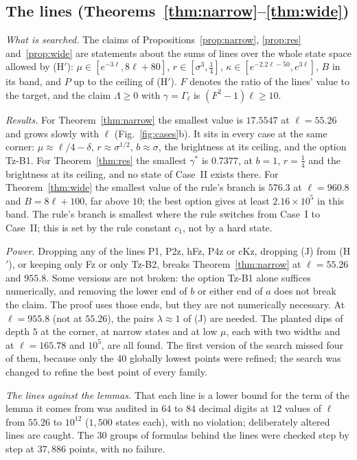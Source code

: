 \subsection{The lines (Theorems~\ref{thm:narrow}--\ref{thm:wide})}

\emph{What is searched.}
The claims of Propositions~\ref{prop:narrow}, \ref{prop:res} and~\ref{prop:wide} are statements about the sums of lines over the whole state space allowed by (H$'$): $\mu\in[e^{-3\ell},8\ell+80]$, $r\in[\sigma^3,\tfrac14]$, $\kappa\in[e^{-2.2\ell-50},e^{3\ell}]$, $B$ in its band, and $P$ up to the ceiling of (H$'$).
$F$ denotes the ratio of the lines' value to the target, and the claim $\Lambda\ge0$ with $\gamma=\Gamma_\ell$ is $(F^2-1)\ell\ge10$.

\emph{Results.}
For Theorem~\ref{thm:narrow} the smallest value is $17.5547$ at $\ell=55.26$ and grows slowly with $\ell$ (Fig.~\ref{fig:cases}b).
It sits in every case at the same corner: $\mu\approx\ell/4-\delta$, $r\approx\sigma^{1/2}$, $b\approx\sigma$, the brightness at its ceiling, and the option Tz-B1.
For Theorem~\ref{thm:res} the smallest $\gamma^*$ is $0.7377$, at $b=1$, $r=\tfrac14$ and the brightness at its ceiling, and no state of Case~II exists there.
For Theorem~\ref{thm:wide} the smallest value of the rule's branch is $576.3$ at $\ell=960.8$ and $B=8\ell+100$, far above $10$; the best option gives at least $2.16\times10^5$ in this band.
The rule's branch is smallest where the rule switches from Case~I to Case~II; this is set by the rule constant $c_1$, not by a hard state.

\emph{Power.}
Dropping any of the lines P1, P2z, hFz, P4z or cKz, dropping (J) from (H$'$), or keeping only Fz or only Tz-B2, breaks Theorem~\ref{thm:narrow} at $\ell=55.26$ and $955.8$.
Some versions are not broken: the option Tz-B1 alone suffices numerically, and removing the lower end of $b$ or either end of $a$ does not break the claim.
The proof uses those ends, but they are not numerically necessary.
At $\ell=955.8$ (not at $55.26$), the pairs $\lambda\approx1$ of (J) are needed.
The planted dips of depth $5$ at the corner, at narrow states and at low $\mu$, each with two widths and at $\ell=165.78$ and $10^5$, are all found.
The first version of the search missed four of them, because only the 40 globally lowest points were refined; the search was changed to refine the best point of every family.

\emph{The lines against the lemmas.}
That each line is a lower bound for the term of the lemma it comes from was audited in $64$ to $84$ decimal digits at $12$ values of $\ell$ from $55.26$ to $10^{12}$ ($1{,}500$ states each), with no violation; deliberately altered lines are caught.
The $30$ groups of formulas behind the lines were checked step by step at $37{,}886$ points, with no failure.

